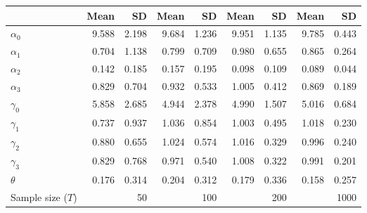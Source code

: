 
\begin{tabular}[t]{lrrrrrrrr}
\toprule
  & Mean & SD & Mean  & SD  & Mean   & SD   & Mean    & SD   \\
\midrule
$\alpha_{0}$ & 9.588 & 2.198 & 9.684 & 1.236 & 9.951 & 1.135 & 9.785 & 0.443\\
$\alpha_{1}$ & 0.704 & 1.138 & 0.799 & 0.709 & 0.980 & 0.655 & 0.865 & 0.264\\
$\alpha_{2}$ & 0.142 & 0.185 & 0.157 & 0.195 & 0.098 & 0.109 & 0.089 & 0.044\\
$\alpha_{3}$ & 0.829 & 0.704 & 0.932 & 0.533 & 1.005 & 0.412 & 0.869 & 0.189\\
$\gamma_{0}$ & 5.858 & 2.685 & 4.944 & 2.378 & 4.990 & 1.507 & 5.016 & 0.684\\
$\gamma_{1}$ & 0.737 & 0.937 & 1.036 & 0.854 & 1.003 & 0.495 & 1.018 & 0.230\\
$\gamma_{2}$ & 0.880 & 0.655 & 1.024 & 0.574 & 1.016 & 0.329 & 0.996 & 0.240\\
$\gamma_{3}$ & 0.829 & 0.768 & 0.971 & 0.540 & 1.008 & 0.322 & 0.991 & 0.201\\
$\theta$ & 0.176 & 0.314 & 0.204 & 0.312 & 0.179 & 0.336 & 0.158 & 0.257\\
Sample size ($T$) &  & 50 &  & 100 &  & 200 &  & 1000\\
\bottomrule
\end{tabular}
